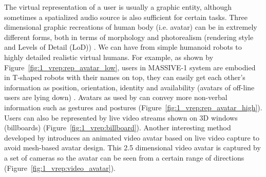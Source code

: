 The virtual representation of a user is usually a graphic entity, although sometimes a spatialized audio source is also sufficient for certain tasks. Three dimensional graphic recreations of human body (i.e. avatar) can be in extremely different forms, both in terms of morphology and photorealism (rendering style and Levels of Detail (LoD)) \citep{Garau2006Fidelity}. We can have from simple humanoid robots to highly detailed realistic virtual humans. For example, as shown by Figure~\ref{fig:1_vrep:rep_avatar_low}, users in MASSIVE-1 system are embodied in T-shaped robots with their names on top, they can easily get each other's information as position, orientation, identity and availability (avatars of off-line users are lying down) \citep{Greenhalgh1995MASSIVE}. Avatars as used by \citet{Roberts2004SSH} can convey more non-verbal information such as gestures and postures (Figure~\ref{fig:1_vrep:rep_avatar_high}). Users can also be represented by live video streams shown on 3D windows (billboards) \citep{Hayashi2007Immersive} (Figure~\ref{fig:1_vrep:billboard}). Another interesting method developed by \citet{Ogi2001SteAva} introduces an animated video avatar based on live video capture to avoid mesh-based avatar design. This 2.5 dimensional video avatar is captured by a set of cameras so the avatar can be seen from a certain range of directions (Figure~\ref{fig:1_vrep:video_avatar}).


